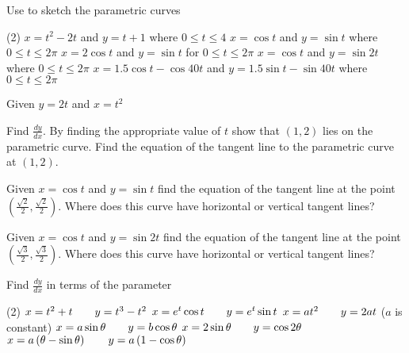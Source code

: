 \begin{Exercise}[title={Parametric Differentiation},label=exParametric]
	\Question Use \desmos to sketch the parametric curves
	\begin{tasks}(2)
		\task $x =t^{2} -2 t$ and $y =t +1$ where $0 \leqslant t \leqslant 4$ %
		\task $x =\cos  t$ and $y =\sin  t$ where $0 \leqslant t \leqslant 2 \pi $ %
		\task $x =2 \cos  t$ and $y =\sin  t$ for $0 \leqslant t \leqslant 2 \pi $%
		\task $x =\cos  t$ and $y =\sin  2 t$ where $0 \leqslant t \leqslant 2 \pi $ %
		\task* $x =1.5 \cos  t -\cos  40 t$ and $y =1.5 \sin  t -\sin  40 t$ where $0 \leqslant t \leqslant 2 \pi $%
	\end{tasks}
	
	\Question Given $y =2 t$ and $x =t^{2}$ 
	\begin{tasks}
		\task Find $\frac{d y}{d x}$.%
		\task By finding the appropriate value of $t$ show that $(1 ,2)$ lies on the parametric curve. %
		\task Find the equation of the tangent line to the parametric curve at $(1 ,2)$. %
	\end{tasks}

	\Question Given
	$x =\cos  t$ and $y =\sin  t$ find the equation of the tangent line at the point $\left (\frac{\sqrt{2}}{2} ,\frac{\sqrt{2}}{2}\right )$. Where does this curve	have horizontal or vertical tangent lines? %
	
	\Question Given $x =\cos  t$ and $y =\sin  2 t$ find the equation of the tangent line at the point $\left (\frac{\sqrt{3}}{2} ,\frac{\sqrt{3}}{2}\right )$. Where does this curve have horizontal or vertical tangent lines? %
	
		\Question Find $\frac{d y}{d x}$ in terms of the parameter 
	\begin{tasks}(2)
		\task  $x =t^{2} +t\text{\quad \quad }y =t^{3} -t^{2}$ %
		\task $x =e^{t} \cos  t\text{\quad \quad }y =e^{t} \sin  t$ %
		\task $x =a t^{2}\text{\quad \quad }y =2 a t$ ($a$ is constant) %
		\task $x =a \sin  \theta \text{\quad \quad }y =b \cos  \theta $ %
		\task $x =2 \sin  \theta \text{\quad \quad }y =\cos  2 \theta $ %
		\task $x =a \left (\theta  -\sin  \theta \right )\text{\quad \quad }y =a \left (1 -\cos  \theta \right )$%
	\end{tasks}
	
\end{Exercise}
